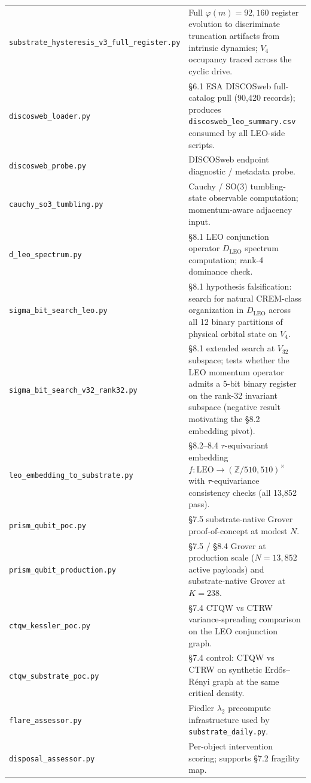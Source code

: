 \documentclass[
]{article}
\begin{document}
{\begin{longtable}[]{@{}
  >{\raggedright\arraybackslash}p{}
  >{\raggedright\arraybackslash}p{}@{}}
\texttt{substrate\_hysteresis\_v3\_full\_register.py} & Full
\(\varphi(m) = 92{,}160\) register evolution to discriminate truncation
artifacts from intrinsic dynamics; \(V_4\) occupancy traced across the
cyclic drive. \\
\texttt{discosweb\_loader.py} & §6.1 ESA DISCOSweb full-catalog pull
(90,420 records); produces \texttt{discosweb\_leo\_summary.csv} consumed
by all LEO-side scripts. \\
\texttt{discosweb\_probe.py} & DISCOSweb endpoint diagnostic / metadata
probe. \\
\texttt{cauchy\_so3\_tumbling.py} & Cauchy / SO(3) tumbling-state
observable computation; momentum-aware adjacency input. \\
\texttt{d\_leo\_spectrum.py} & §8.1 LEO conjunction operator
\(D_\text{LEO}\) spectrum computation; rank-4 dominance check. \\
\texttt{sigma\_bit\_search\_leo.py} & §8.1 hypothesis falsification:
search for natural CREM-class organization in \(D_\text{LEO}\) across
all 12 binary partitions of physical orbital state on \(V_4\). \\
\texttt{sigma\_bit\_search\_v32\_rank32.py} & §8.1 extended search at
\(V_{32}\) subspace; tests whether the LEO momentum operator admits a
5-bit binary register on the rank-32 invariant subspace (negative result
motivating the §8.2 embedding pivot). \\
\texttt{leo\_embedding\_to\_substrate.py} & §8.2--8.4
\(\tau\)-equivariant embedding
\(f: \text{LEO} \to (\mathbb{Z}/510{,}510)^\times\) with
\(\tau\)-equivariance consistency checks (all 13,852 pass). \\
\texttt{prism\_qubit\_poc.py} & §7.5 substrate-native Grover
proof-of-concept at modest \(N\). \\
\texttt{prism\_qubit\_production.py} & §7.5 / §8.4 Grover at production
scale (\(N = 13{,}852\) active payloads) and substrate-native Grover at
\(K = 238\). \\
\texttt{ctqw\_kessler\_poc.py} & §7.4 CTQW vs CTRW variance-spreading
comparison on the LEO conjunction graph. \\
\texttt{ctqw\_substrate\_poc.py} & §7.4 control: CTQW vs CTRW on
synthetic Erdős--Rényi graph at the same critical density. \\
\texttt{flare\_assessor.py} & Fiedler \(\lambda_2\) precompute
infrastructure used by \texttt{substrate\_daily.py}. \\
\texttt{disposal\_assessor.py} & Per-object intervention scoring;
supports §7.2 fragility map. \\

\end{longtable}}
\end{document}
